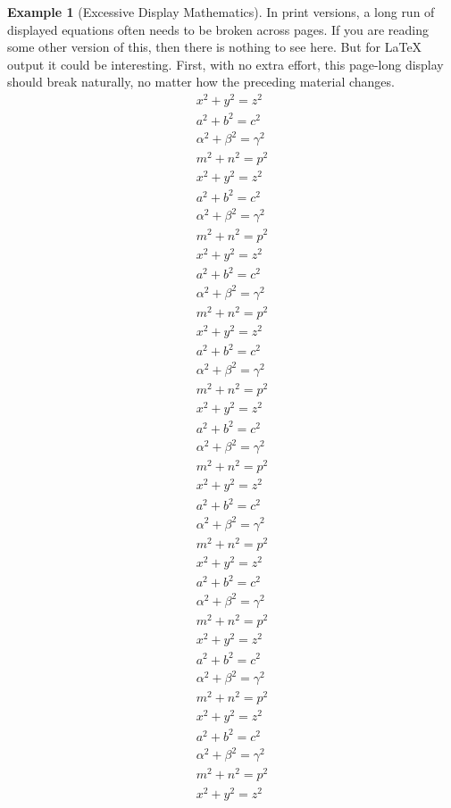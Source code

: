 \documentclass{amsart}
\theoremstyle{plain}%
\theoremstyle{definition}%
\newtheorem{example}[theorem]{Example}
\theoremstyle{remark}%
\numberwithin{equation}{section}
\begin{document}
\begin{example}[Excessive Display Mathematics]\label{section-mathematics-4-9}%
%
In print versions, a long run of displayed equations often needs to be broken across pages.  If you are reading some other version of this, then there is nothing to see here.  But for \LaTeX{} output it could be interesting.  First, with no extra effort, this page-long display should break naturally, no matter how the preceding material changes.%
\begin{gather*}
x^2+y^2=z^2\\
a^2+b^2=c^2\\
\alpha^2+\beta^2=\gamma^2\\
m^2+n^2=p^2\\
x^2+y^2=z^2\\
a^2+b^2=c^2\\
\alpha^2+\beta^2=\gamma^2\\
m^2+n^2=p^2\\
x^2+y^2=z^2\\
a^2+b^2=c^2\\
\alpha^2+\beta^2=\gamma^2\\
m^2+n^2=p^2\\
x^2+y^2=z^2\\
a^2+b^2=c^2\\
\alpha^2+\beta^2=\gamma^2\\
m^2+n^2=p^2\\
x^2+y^2=z^2\\
a^2+b^2=c^2\\
\alpha^2+\beta^2=\gamma^2\\
m^2+n^2=p^2\\
x^2+y^2=z^2\\
a^2+b^2=c^2\\
\alpha^2+\beta^2=\gamma^2\\
m^2+n^2=p^2\\
x^2+y^2=z^2\\
a^2+b^2=c^2\\
\alpha^2+\beta^2=\gamma^2\\
m^2+n^2=p^2\\
x^2+y^2=z^2\\
a^2+b^2=c^2\\
\alpha^2+\beta^2=\gamma^2\\
m^2+n^2=p^2\\
x^2+y^2=z^2\\
a^2+b^2=c^2\\
\alpha^2+\beta^2=\gamma^2\\
m^2+n^2=p^2\\
x^2+y^2=z^2\\

\end{gather*}
\end{example}
\end{document}
